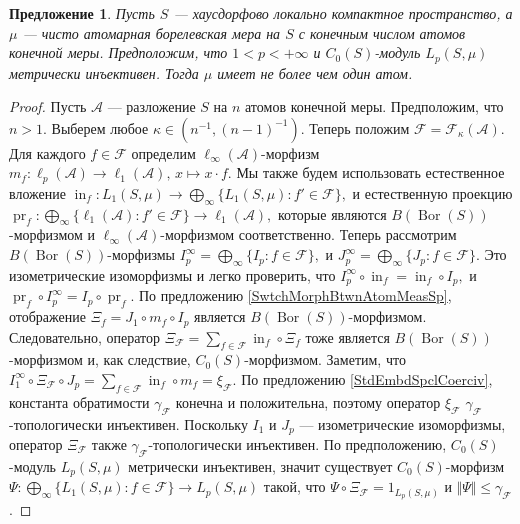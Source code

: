 \documentclass[12pt]{article}
\newtheorem{proposition}[theorem]{Предложение}
\begin{document}
\begin{proposition}\label{MetInjC0SModLpSmuOnFinAtmMeasSpCharac}
    Пусть $S$ --- хаусдорфово локально компактное пространство, а $\mu$ --- 
    чисто атомарная борелевская мера на $S$ с конечным числом атомов конечной 
    меры. Предположим, что $1<p<+\infty$ и $C_0(S)$-модуль $L_p(S,\mu)$ 
    метрически инъективен. Тогда $\mu$ имеет не более чем один атом.
\end{proposition}
\begin{proof}
    Пусть $\mathcal{A}$ --- разложение $S$ на $n$ атомов конечной меры. 
    Предположим, что $n>1$. Выберем любое $\kappa\in(n^{-1}, (n-1)^{-1})$. 
    Теперь положим $\mathcal{F}=\mathcal{F}_{\kappa}(\mathcal{A})$. Для 
    каждого $f\in \mathcal{F}$ определим $\ell_\infty(\mathcal{A})$-морфизм 
    $
        m_f:
        \ell_p(\mathcal{A})\to\ell_1(\mathcal{A}),\,
        x\mapsto x\cdot f.
    $
    Мы также будем использовать естественное вложение 
    $
        \operatorname{in}_f:
        L_1(S,\mu)\to\bigoplus_\infty\{L_1(S,\mu):f'\in\mathcal{F}\},
    $
    и естественную проекцию
    $
        \operatorname{pr}_f:
        \bigoplus_\infty\{
            \ell_1(\mathcal{A}):f'\in\mathcal{F}
        \}\to\ell_1(\mathcal{A}),
    $
    которые являются $B(\operatorname{Bor}(S))$-морфизмом 
    и $\ell_\infty(\mathcal{A})$-морфизмом соответственно. Теперь 
    рассмотрим $B(\operatorname{Bor}(S))$-морфизмы 
    $
        I_p^\infty=\bigoplus_\infty\{I_p:f\in\mathcal{F}\},
    $
    и
    $
        J_p^\infty=\bigoplus_\infty\{J_p:f\in\mathcal{F}\}.
    $
    Это изометрические изоморфизмы и легко проверить, что 
    $
        I_p^\infty \circ \operatorname{in}_f=\operatorname{in}_f\circ I_p,
    $
    и
    $
        \operatorname{pr}_f\circ I_p^\infty=I_p\circ \operatorname{pr}_f.
    $
    По предложению \ref{SwtchMorphBtwnAtomMeasSp}, 
    отображение $\Xi_f=J_1\circ m_f\circ I_p$ 
    является $B(\operatorname{Bor}(S))$-морфизмом. Следовательно, оператор 
    $
        \Xi_{\mathcal{F}}=\sum_{f\in\mathcal{F}}\operatorname{in}_f\circ \Xi_f
    $
    тоже является $B(\operatorname{Bor}(S))$-морфизмом и, как 
    следствие, $C_0(S)$-морфизмом. Заметим, что
    $
        I_1^\infty\circ\Xi_\mathcal{F}\circ J_p
        = \sum_{f\in\mathcal{F}} 
            \operatorname{in}_f\circ m_f 
        =\xi_{\mathcal{F}}.
    $
    По предложению \ref{StdEmbdSpclCoerciv}, константа 
    обратимости $\gamma_{\mathcal{F}}$ конечна и положительна, 
    поэтому оператор $\xi_{\mathcal{F}}$ $\gamma_{\mathcal{F}}$-топологически 
    инъективен. Поскольку $I_1$ и $J_p$ --- изометрические изоморфизмы, 
    оператор $\Xi_{\mathcal{F}}$ также $\gamma_{\mathcal{F}}$-топологически 
    инъективен. По предположению, $C_0(S)$-модуль $L_p(S,\mu)$ 
    метрически инъективен, значит существует $C_0(S)$-морфизм 
    $
        \Psi:
        \bigoplus_\infty\{ L_1(S,\mu):f\in\mathcal{F}\}\to L_p(S,\mu)
    $
    такой, что $\Psi\circ \Xi_{\mathcal{F}}=1_{L_p(S,\mu)}$ 
    и $\Vert \Psi\Vert\leq \gamma_{\mathcal{F}}$.


\end{proof}
\end{document}
